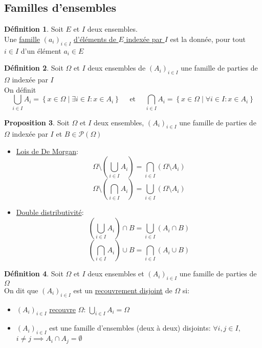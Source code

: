 \documentclass[10pt,a4paper]{article}
\theoremstyle{definition}
\newtheorem{proposition}{Proposition}[section]
\newtheorem{definition}[proposition]{Définition}
\begin{document}
\subsection{Familles d'ensembles}
\begin{definition}
Soit $E$ et $I$ deux ensembles. \\
Une \uline{famille} $(a_i)_{i \in I}$ \uline{d'éléments de $E$ indexée par $I$} est la donnée, pour tout $i \in I$ d'un élément $a_i \in E$
\end{definition}
\begin{definition}
Soit $\Omega$ et $I$ deux ensembles de $(A_i)_{i \in I}$ une famille de parties de $\Omega$ indexée par $I$ \\
On définit
\[ \bigcup_{i \in I} A_i = \left\{ x \in \Omega \mid \exists i \in I: x \in A_i \right\} \quad \text{ et } \quad \bigcap_{i \in I} A_i = \left\{ x \in \Omega \mid \forall i \in I: x \in A_i \right\} \]
\end{definition}
\begin{proposition}
Soit $\Omega$ et $I$ deux ensembles, $(A_i)_{i \in I}$ une famille de parties de $\Omega$ indexée par $I$ et $B \in \mathcal{P}(\Omega)$
\begin{itemize}
\item \uline{Lois de De Morgan}:
\[ \Omega \setminus \left( \bigcup_{i \in I} A_i \right) = \bigcap_{i \in I} \left( \Omega \setminus A_i \right) \]
\[ \Omega \setminus \left( \bigcap_{i \in I} A_i \right) = \bigcup_{i \in I} \left( \Omega \setminus A_i \right) \]
\item \uline{Double distributivité}:
\[ \left( \bigcup_{i \in I} A_i \right) \cap B = \bigcup_{i \in I} \left(A_i \cap B \right) \]
\[ \left( \bigcap_{i \in I} A_i \right) \cup B = \bigcap_{i \in I} \left(A_i \cup B \right) \]
\end{itemize}
\end{proposition}
\begin{definition}
Soit $\Omega$ et $I$ deux ensembles et $(A_i)_{i \in I}$ une famille de parties de $\Omega$ \\
On dit que $(A_i)_{i \in I}$ est un \uline{recouvrement disjoint} de $\Omega$ si:
\begin{itemize}
\item $(A_i)_{i \in I}$ \uline{recouvre} $\Omega$: $\bigcup\limits_{i \in I} A_i = \Omega$
\item $(A_i)_{i \in I}$ est une famille d'ensembles (deux à deux) disjoints: $\forall i, j \in I$, $i \neq j \implies A_i \cap A_j = \emptyset$
\end{itemize}
\end{definition}
\end{document}
